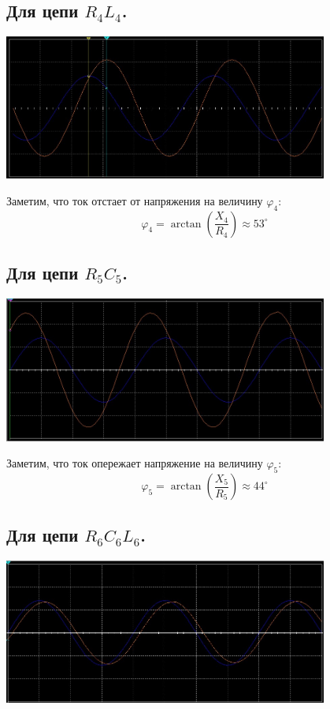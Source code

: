 \documentclass[14pt, a4paper]{article}
\begin{document}
        \subsection*{Для цепи $R_4L_4$.}
        {
            \includegraphics[width=0.8\textwidth]{RL_osc.jpg}
            \centering
        }

        Заметим, что ток отстает от напряжения на величину $\varphi_4$:
        $$\varphi_4 = \arctan(\frac{X_4}{R_4}) \approx 53^\circ$$

        \subsection*{Для цепи $R_5C_5$.}

        {
            \includegraphics[width=0.8\textwidth]{RC_osc.jpg}
            \centering
        }

        Заметим, что ток опережает напряжение на величину $\varphi_5$:
        $$\varphi_5 = \arctan(\frac{X_5}{R_5}) \approx 44^\circ$$

        \subsection*{Для цепи $R_6C_6L_6$.}

        {
            \includegraphics[width=0.8\textwidth]{RCL_osc.jpg}
            \centering
        }
\end{document}
